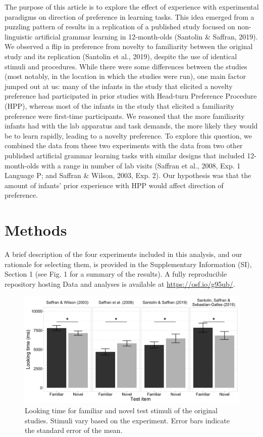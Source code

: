 \documentclass[english,man]{apa6}
\begin{document}
The purpose of this article is to explore the effect of experience with experimental paradigms on direction of preference in learning tasks. This idea emerged from a puzzling pattern of results in a replication of a published study focused on non-linguistic artificial grammar learning in 12-month-olds (Santolin \& Saffran, 2019). We observed a flip in preference from novelty to familiarity between the original study and its replication (Santolin et al., 2019), despite the use of identical stimuli and procedures. While there were some differences between the studies (most notably, in the location in which the studies were run), one main factor jumped out at us: many of the infants in the study that elicited a novelty preference had participated in prior studies with Head-turn Preference Procedure (HPP), whereas most of the infants in the study that elicited a familiarity preference were first-time participants. We reasoned that the more familiarity infants had with the lab apparatus and task demands, the more likely they would be to learn rapidly, leading to a novelty preference. To explore this question, we combined the data from these two experiments with the data from two other published artificial grammar learning tasks with similar designs that included 12-month-olds with a range in number of lab visits (Saffran et al., 2008, Exp. 1 Language P; and Saffran \& Wilson, 2003, Exp. 2). Our hypothesis was that the amount of infants' prior experience with HPP would affect direction of preference.

\hypertarget{methods}{%
\section{Methods}\label{methods}}

A brief description of the four experiments included in this analysis, and our rationale for selecting them, is provided in the Supplementary Information (SI), Section 1 (see Fig. 1 for a summary of the results). A fully reproducible repository hosting Data and analyses is available at \url{https://osf.io/g95ub/}.

\begin{figure}
\includegraphics[width=\textwidth]{Figures/01_lookingtimes-study} \caption{Looking time for familiar and novel test stimuli of the original studies. Stimuli vary based on the experiment. Error bars indicate the standard error of the mean.}\label{fig:unnamed-chunk-1}
\end{figure}
\end{document}
